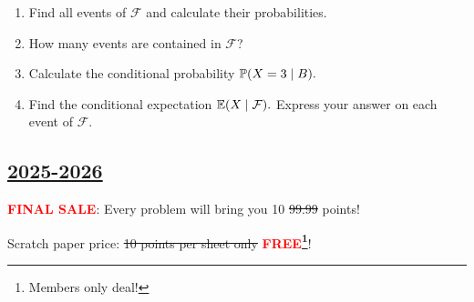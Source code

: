 \begin{enumerate}
\begin{enumerate}
    \item[(a)] [3]
    Find all events of $\mathcal{F}$ and
    calculate their probabilities.

    \item[(b)] [1]
    How many events are contained in
    $\mathcal{F}$?

     \item[(c)] [3]
    Calculate the conditional probability
    \(
    \P(X=3\mid B).
    \)

  
    \item[(d)] [3]
    Find the conditional expectation
    \(
    \E(X\mid\mathcal{F}).
    \)
    Express your answer on each event
    of $\mathcal{F}$.
\end{enumerate}

\end{enumerate}

\subsection[2025-2026]{\hyperref[sec:sol_kr_01_2025_2026]{2025-2026}}
\label{sec:kr_01_2025_2026} %

\textcolor{red}{\textbf{FINAL SALE}}: Every problem will bring you 10 \sout{99.99} points!

Scratch paper price: \sout{10 points per sheet only} \textcolor{red}{\textbf{FREE\footnote[1]{Members only deal!}}}!

